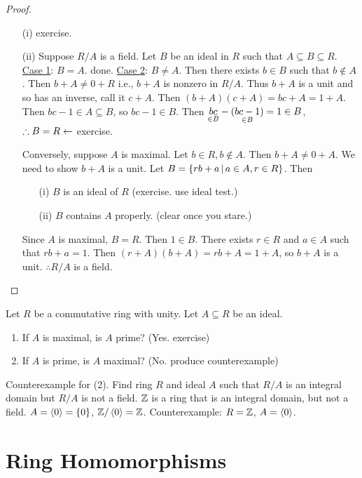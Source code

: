 \documentclass[]{article}
\begin{document}
\begin{proof}
	\begin{itemize}
		\item[(i)] exercise.
		\item[(ii)] Suppose $R/A$ is a field. Let $B$ be an ideal in $R$ such that $A\subseteq B\subseteq R$.
			\ul{Case 1}: $B=A$. done.
			\ul{Case 2}: $B\neq A$. Then there exists $b\in B$ such that $b\notin A$.
			Then $b+A\neq0+R$ i.e., $b+A$ is nonzero in $R/A$.
			Thus $b+A$ is a unit and so has an inverse, call it $c+A$.
			Then $(b+A)(c+A)=bc+A=1+A$. Then $bc-1\in A\subseteq B$, so $bc-1\in B$.
			Then $\underset{\in B}{bc}-(\underset{\in B}{bc-1})=1\in B$, $\therefore B=R \leftarrow$ exercise.

			Conversely, suppose $A$ is maximal. Let $b\in R,b\notin A$.
			Then $b+A\neq0+A$. We need to show $b+A$ is a unit.
			Let $B=\left\{ rb+a \, \middle| \, a\in A,r\in R \right\}$. Then
			\begin{itemize}
				\item[(i)] $B$ is an ideal of $R$ (exercise. use ideal test.)
				\item[(ii)] $B$ contains $A$ properly. (clear once you stare.)
			\end{itemize}
			Since $A$ is maximal, $B=R$. Then $1\in B$. There exists $r\in R$ and $a\in A$ such that $rb+a=1$.
			Then $(r+A)(b+A)=rb+A=1+A$, so $b+A$ is a unit. $\therefore R/A$ is a field.
	\end{itemize}
\end{proof}

\begin{question}
	Let $R$ be a commutative ring with unity. Let $A\subseteq R$ be an ideal.
	\begin{enumerate}
		\item If $A$ is maximal, is $A$ prime? (Yes. exercise)
		\item If $A$ is prime, is $A$ maximal? (No. produce counterexample)
	\end{enumerate}
	Counterexample for (2). Find ring $R$ and ideal $A$ such that $R/A$ is an integral domain but $R/A$ is not a field.
	$\mathbb{Z}$ is a ring that is an integral domain, but not a field.
	$A=\left\langle 0 \right\rangle=\left\{ 0 \right\}$, $\mathbb{Z}/\left\langle 0 \right\rangle=\mathbb{Z}$.
	Counterexample: $R=\mathbb{Z}$, $A=\left\langle 0 \right\rangle$.
\end{question}

\section{Ring Homomorphisms}
\end{document}
